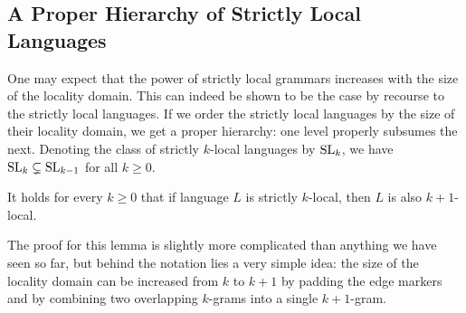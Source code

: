 \subsection{A Proper Hierarchy of Strictly Local Languages}
One may expect that the power of strictly local grammars increases with the size of the locality domain.
This can indeed be shown to be the case by recourse to the strictly local languages.
If we order the strictly local languages by the size of their locality domain, we get a proper hierarchy: one level properly subsumes the next.
Denoting the class of strictly $k$-local languages by $\mathrm{SL}_k$, we have $\mathrm{SL}_k \subsetneq \mathrm{SL}_{k-1}$ for all $k \geq 0$.
%
\begin{lemma}
    It holds for every $k \geq 0$ that if language $L$ is strictly $k$-local, then $L$ is also $k+1$-local.
\end{lemma}
%
The proof for this lemma is slightly more complicated than anything we have seen so far, but behind the notation lies a very simple idea:
the size of the locality domain can be increased from $k$ to $k+1$ by padding the edge markers and by combining two overlapping $k$-grams into a single $k+1$-gram.
%
